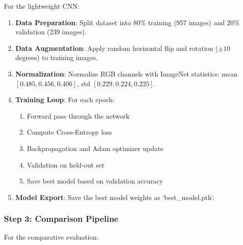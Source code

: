 \documentclass[conference]{IEEEtran}
\begin{document}
For the lightweight CNN:

\begin{enumerate}
    \item \textbf{Data Preparation}: Split dataset into 80\% training (957 images) and 20\% validation (239 images).
    
    \item \textbf{Data Augmentation}: Apply random horizontal flip and rotation ($\pm 10$ degrees) to training images.
    
    \item \textbf{Normalization}: Normalize RGB channels with ImageNet statistics: mean $[0.485, 0.456, 0.406]$, std $[0.229, 0.224, 0.225]$.
    
    \item \textbf{Training Loop}: For each epoch:
    \begin{enumerate}
        \item Forward pass through the network
        \item Compute Cross-Entropy loss
        \item Backpropagation and Adam optimizer update
        \item Validation on held-out set
        \item Save best model based on validation accuracy
    \end{enumerate}
    
    \item \textbf{Model Export}: Save the best model weights as `best\_model.pth`.
\end{enumerate}

\subsubsection{Step 3: Comparison Pipeline}

For the comparative evaluation:
\end{document}
